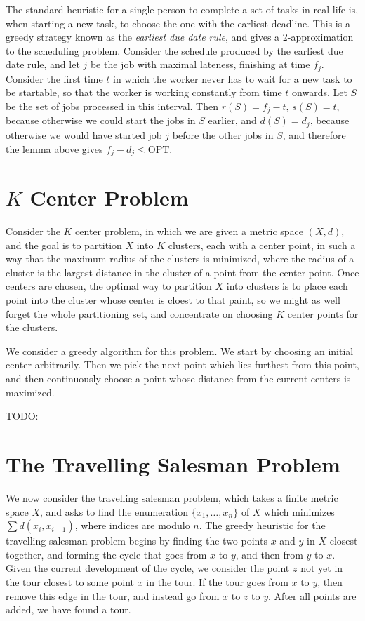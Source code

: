 The standard heuristic for a single person to complete a set of tasks in real life is, when starting a new task, to choose the one with the earliest deadline. This is a greedy strategy known as the {\it earliest due date rule},  and gives a 2-approximation to the scheduling problem. Consider the schedule produced by the earliest due date rule, and let $j$ be the job with maximal lateness, finishing at time $f_j$. Consider the first time $t$ in which the worker never has to wait for a new task to be startable, so that the worker is working constantly from time $t$ onwards. Let $S$ be the set of jobs processed in this interval. Then $r(S) = f_j - t$, $s(S) = t$, because otherwise we could start the jobs in $S$ earlier, and $d(S) = d_j$, because otherwise we would have started job $j$ before the other jobs in $S$, and therefore the lemma above gives $f_j - d_j \leq \text{OPT}$.

\section{$K$ Center Problem}

Consider the $K$ center problem, in which we are given a metric space $(X,d)$, and the goal is to partition $X$ into $K$ clusters, each with a center point, in such a way that the maximum radius of the clusters is minimized, where the radius of a cluster is the largest distance in the cluster of a point from the center point. Once centers are chosen, the optimal way to partition $X$ into clusters is to place each point into the cluster whose center is cloest to that paint, so we might as well forget the whole partitioning set, and concentrate on choosing $K$ center points for the clusters.

We consider a greedy algorithm for this problem. We start by choosing an initial center arbitrarily. Then we pick the next point which lies furthest from this point, and then continuously choose a point whose distance from the current centers is maximized.

TODO:

\section{The Travelling Salesman Problem}

We now consider the travelling salesman problem, which takes a finite metric space $X$, and asks to find the enumeration $\{ x_1, \dots, x_n \}$ of $X$ which minimizes $\sum d(x_i,x_{i+1})$, where indices are modulo $n$. The greedy heuristic for the travelling salesman problem begins by finding the two points $x$ and $y$ in $X$ closest together, and forming the cycle that goes from $x$ to $y$, and then from $y$ to $x$. Given the current development of the cycle, we consider the point $z$ not yet in the tour closest to some point $x$ in the tour. If the tour goes from $x$ to $y$, then remove this edge in the tour, and instead go from $x$ to $z$ to $y$. After all points are added, we have found a tour.

